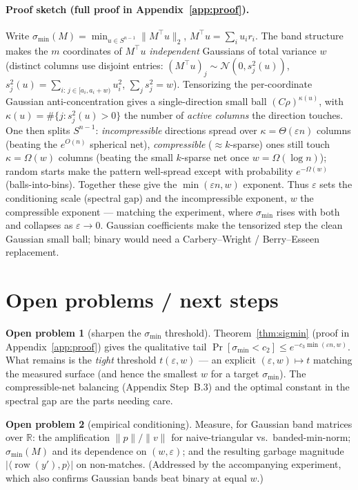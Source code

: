 \documentclass[11pt]{article}
\newcommand{\norm}[1]{\lVert #1 \rVert}
\newcommand{\sigmin}{\sigma_{\min}}
\DeclareMathOperator{\row}{row}
\theoremstyle{plain}
\theoremstyle{definition}
\newtheorem{problem}{Open problem}
\begin{document}
\paragraph{Proof sketch (full proof in Appendix~\ref{app:proof}).}
Write $\sigmin(M)=\min_{u\in S^{n-1}}\norm{M^\top u}_2$, $M^\top u=\sum_i u_i r_i$. The band
structure makes the $m$ coordinates of $M^\top u$ \emph{independent} Gaussians of total
variance $w$ (distinct columns use disjoint entries: $(M^\top u)_j\sim\mathcal N(0,s_j^2(u))$,
$s_j^2(u)=\sum_{i:\,j\in[a_i,a_i+w)}u_i^2$, $\sum_j s_j^2=w$). Tensorizing the per-coordinate
Gaussian anti-concentration gives a single-direction small ball $(C\rho)^{\kappa(u)}$, with
$\kappa(u)=\#\{j:s_j^2(u)>0\}$ the number of \emph{active columns} the direction touches. One
then splits $S^{n-1}$: \emph{incompressible} directions spread over $\kappa=\Theta(\varepsilon
n)$ columns (beating the $e^{O(n)}$ spherical net), \emph{compressible} ($\approx k$-sparse)
ones still touch $\kappa=\Omega(w)$ columns (beating the small $k$-sparse net once
$w=\Omega(\log n)$); random starts make the pattern well-spread except with probability
$e^{-\Omega(w)}$ (balls-into-bins). Together these give the $\min(\varepsilon n,w)$ exponent.
Thus $\varepsilon$ sets the conditioning scale (spectral gap) and the incompressible exponent,
$w$ the compressible exponent --- matching the experiment, where $\sigmin$ rises with both and
collapses as $\varepsilon\to0$. Gaussian coefficients make the tensorized step the clean
Gaussian small ball; binary would need a Carbery--Wright / Berry--Esseen replacement.

\section{Open problems / next steps}

\begin{problem}[sharpen the $\sigmin$ threshold]
Theorem~\ref{thm:sigmin} (proof in Appendix~\ref{app:proof}) gives the qualitative tail
$\Pr[\sigmin<c_2]\le e^{-c_3\min(\varepsilon n,w)}$. What remains is the \emph{tight} threshold
$t(\varepsilon,w)$ --- an explicit $(\varepsilon,w)\mapsto t$ matching the measured surface
(and hence the smallest $w$ for a target $\sigmin$). The compressible-net balancing
(Appendix Step~B.3) and the optimal constant in the spectral gap are the parts needing care.
\end{problem}

\begin{problem}[empirical conditioning]
Measure, for Gaussian band matrices over $\mathbb{R}$: the amplification
$\norm{p}/\norm{v}$ for naive-triangular vs.\ banded-min-norm; $\sigmin(M)$ and its
dependence on $(w,\varepsilon)$; and the resulting garbage magnitude
$|\langle\row(y'),p\rangle|$ on non-matches. (Addressed by the accompanying experiment, which
also confirms Gaussian bands beat binary at equal $w$.)
\end{problem}
\end{document}
